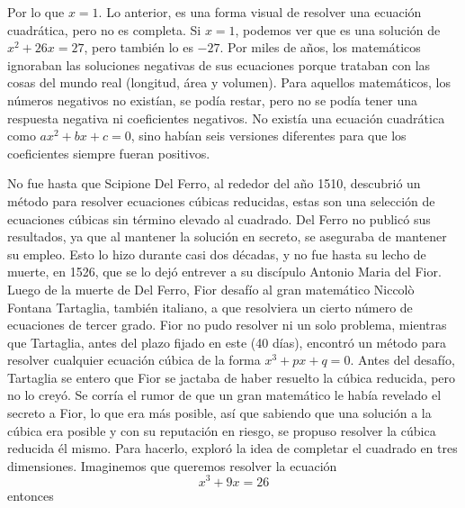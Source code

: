 Por lo que $x=1$. Lo anterior, es una forma visual de resolver una ecuación cuadrática, pero no es completa. Si $x=1$, podemos ver que es una solución de $x^2+26x=27$, pero también lo es $-27$. Por miles de años, los matemáticos ignoraban las soluciones negativas de sus ecuaciones porque  trataban con las cosas del mundo real (longitud, área y volumen). Para aquellos matemáticos, los números negativos no existían, se podía restar, pero no se podía tener una respuesta negativa ni coeficientes negativos. No existía una ecuación cuadrática como $ax^2+bx+c=0$, sino habían seis versiones diferentes para que los coeficientes siempre fueran positivos.

No fue hasta que Scipione Del Ferro, al rededor del año 1510, descubrió un método para resolver ecuaciones cúbicas reducidas, estas son una selección de ecuaciones cúbicas sin término elevado al cuadrado. Del Ferro no publicó sus resultados, ya que al mantener la solución en secreto, se aseguraba de mantener su empleo. Esto lo hizo durante casi dos décadas, y no fue hasta su lecho de muerte, en 1526, que se lo dejó entrever a su discípulo Antonio Maria del Fior. Luego de la muerte de Del Ferro, Fior desafío al gran matemático Niccolò Fontana Tartaglia, también italiano, a que resolviera un cierto número de ecuaciones de tercer grado. Fior no pudo resolver ni un solo problema, mientras que Tartaglia, antes del plazo fijado en este (40 días), encontró un método para resolver cualquier ecuación cúbica de la forma $x^3+px+q=0$. Antes del desafío, Tartaglia se entero que Fior se jactaba de haber resuelto la cúbica reducida, pero no lo creyó. Se corría el rumor de que un gran matemático le había revelado el secreto a Fior, lo que era más posible, así que sabiendo que una solución a la cúbica era posible y con su reputación en riesgo, se propuso resolver la cúbica reducida él mismo. Para hacerlo, exploró la idea de completar el cuadrado en tres dimensiones. Imaginemos que queremos resolver la ecuación
\begin{equation}
    x^3+9x=26 \label{ecuacioncardanoaresolver}
\end{equation}
entonces
